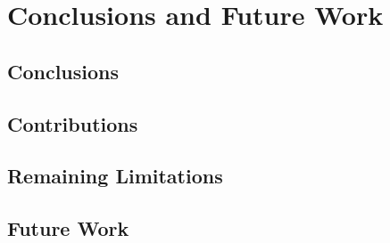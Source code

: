 \chapter{Conclusions and Future Work}

\section{Conclusions}

\section{Contributions}

\section{Remaining Limitations}

\section{Future Work}
